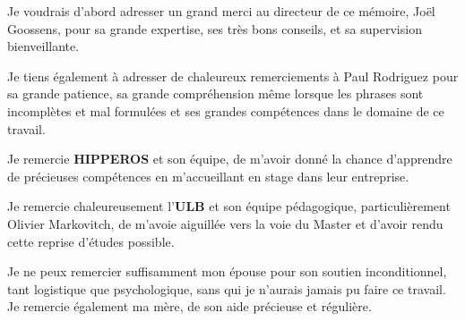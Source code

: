 Je  voudrais d'abord adresser un grand merci au directeur de ce mémoire, Joël Goossens, pour sa grande expertise, 
ses très bons conseils, et sa supervision bienveillante. \newline

Je tiens également à adresser de chaleureux remerciements à Paul Rodriguez pour sa grande patience, sa grande compréhension 
même lorsque les phrases sont incomplètes et mal formulées et ses grandes compétences dans le domaine de ce travail.\newline

Je remercie \textbf{HIPPEROS }et son équipe, de m'avoir donné la chance d'apprendre de précieuses compétences 
en m'accueillant en stage dans leur entreprise. \newline

Je remercie chaleureusement l'\textbf{ULB} et son équipe pédagogique, particulièrement Olivier Markovitch, de 
m'avoie aiguillée vers la voie du Master et d'avoir rendu cette reprise d'études possible.\newline

Je ne peux remercier suffisamment mon épouse pour son soutien inconditionnel, tant logistique que psychologique, sans 
qui je n'aurais jamais pu faire ce travail. Je remercie également ma mère, de son aide précieuse et régulière.